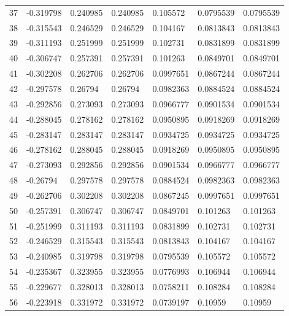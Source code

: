 \begin{longtable}{l|lll|lll}
  37 & -0.319798    & 0.240985    & 0.240985    &  0.105572    & 0.0795539   & 0.0795539   \\
  38 & -0.315543    & 0.246529    & 0.246529    &  0.104167    & 0.0813843   & 0.0813843   \\
  39 & -0.311193    & 0.251999    & 0.251999    &  0.102731    & 0.0831899   & 0.0831899   \\
  40 & -0.306747    & 0.257391    & 0.257391    &  0.101263    & 0.0849701   & 0.0849701   \\
  41 & -0.302208    & 0.262706    & 0.262706    &  0.0997651   & 0.0867244   & 0.0867244   \\
  42 & -0.297578    & 0.26794     & 0.26794     &  0.0982363   & 0.0884524   & 0.0884524   \\
  43 & -0.292856    & 0.273093    & 0.273093    &  0.0966777   & 0.0901534   & 0.0901534   \\
  44 & -0.288045    & 0.278162    & 0.278162    &  0.0950895   & 0.0918269   & 0.0918269   \\
  45 & -0.283147    & 0.283147    & 0.283147    &  0.0934725   & 0.0934725   & 0.0934725   \\
  46 & -0.278162    & 0.288045    & 0.288045    &  0.0918269   & 0.0950895   & 0.0950895   \\
  47 & -0.273093    & 0.292856    & 0.292856    &  0.0901534   & 0.0966777   & 0.0966777   \\
  48 & -0.26794     & 0.297578    & 0.297578    &  0.0884524   & 0.0982363   & 0.0982363   \\
  49 & -0.262706    & 0.302208    & 0.302208    &  0.0867245   & 0.0997651   & 0.0997651   \\
  50 & -0.257391    & 0.306747    & 0.306747    &  0.0849701   & 0.101263    & 0.101263    \\
  51 & -0.251999    & 0.311193    & 0.311193    &  0.0831899   & 0.102731    & 0.102731    \\
  52 & -0.246529    & 0.315543    & 0.315543    &  0.0813843   & 0.104167    & 0.104167    \\
  53 & -0.240985    & 0.319798    & 0.319798    &  0.0795539   & 0.105572    & 0.105572    \\
  54 & -0.235367    & 0.323955    & 0.323955    &  0.0776993   & 0.106944    & 0.106944    \\
  55 & -0.229677    & 0.328013    & 0.328013    &  0.0758211   & 0.108284    & 0.108284    \\
  56 & -0.223918    & 0.331972    & 0.331972    &  0.0739197   & 0.10959     & 0.10959     \\

\end{longtable}
